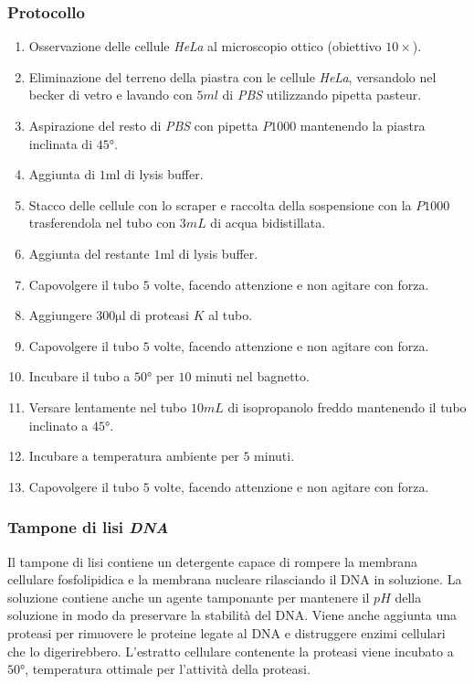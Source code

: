 		\subsubsection{Protocollo}
		\begin{multicols}{2}
		\begin{enumerate}
			\item Osservazione delle cellule \emph{HeLa} al microscopio ottico (obiettivo $10\times$).
			\item Eliminazione del terreno della piastra con le cellule \emph{HeLa}, versandolo nel becker di vetro e lavando con $5\si{ml}$ di \emph{PBS} utilizzando pipetta pasteur.
			\item Aspirazione del resto di \emph{PBS} con pipetta $P1000$ mantenendo la piastra inclinata di $45\si{\degree}$.
			\item Aggiunta di $1\si{\milli\litre}$ di lysis buffer.
			\item Stacco delle cellule con lo scraper e raccolta della sospensione con la $P1000$ trasferendola nel tubo con $3\si{mL}$ di acqua bidistillata.
			\item Aggiunta del restante $1\si{\milli\litre}$ di lysis buffer.
			\item Capovolgere il tubo $5$ volte, facendo attenzione e non agitare con forza.
			\item Aggiungere $300\si{\micro\litre}$ di proteasi $K$ al tubo.
			\item Capovolgere il tubo $5$ volte, facendo attenzione e non agitare con forza.
			\item Incubare il tubo a $50\si{\degree}$ per $10$ minuti nel bagnetto.
			\item Versare lentamente nel tubo $10\si{mL}$ di isopropanolo freddo mantenendo il tubo inclinato a $45\si{\degree}$.
			\item Incubare a temperatura ambiente per $5$ minuti.
			\item Capovolgere il tubo $5$ volte, facendo attenzione e non agitare con forza.
		\end{enumerate}
	\end{multicols}

		\subsubsection{Tampone di lisi \emph{DNA}}
		Il tampone di lisi contiene un detergente capace di rompere la membrana cellulare fosfolipidica e la membrana nucleare rilasciando il DNA in soluzione.
		La soluzione contiene anche un agente tamponante per mantenere il $pH$ della soluzione in modo da preservare la stabilit\`a del DNA.
		Viene anche aggiunta una proteasi per rimuovere le proteine legate al DNA e distruggere enzimi cellulari che lo digerirebbero.
		L'estratto cellulare contenente la proteasi viene incubato a $50\si{\degree}$, temperatura ottimale per l'attivit\`a della proteasi.

